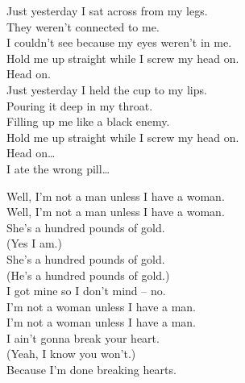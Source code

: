 
\label{album:float-along-fill-your-lungs}




Just yesterday I sat across from my legs. \\
They weren't connected to me. \\
I couldn't see because my eyes weren't in me. \\
Hold me up straight while I screw my head on. \\

Head on. \\

Just yesterday I held the cup to my lips. \\
Pouring it deep in my throat. \\
Filling up me like a black enemy. \\
Hold me up straight while I screw my head on. \\

Head on… \\

I ate the wrong pill… \\




Well, I'm not a man unless I have a woman. \\
Well, I'm not a man unless I have a woman. \\

She's a hundred pounds of gold. \\
(Yes I am.) \\
She's a hundred pounds of gold. \\
(He's a hundred pounds of gold.) \\
I got mine so I don't mind -- no. \\

I'm not a woman unless I have a man. \\
I'm not a woman unless I have a man. \\

I ain't gonna break your heart. \\
(Yeah, I know you won't.) \\
Because I'm done breaking hearts. \\

